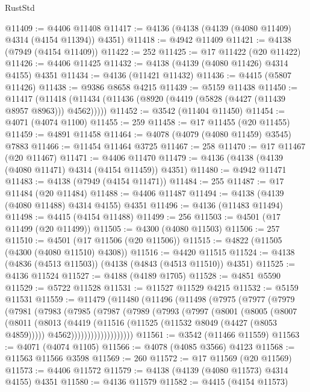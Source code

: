 \begin{lexlean}{RustStd}
\begin{coremodule}
@11409 := @4406 @11408
@11417 := @4136 (@4138 (@4139 (@4080 @11409) @4314 (@4154 @11394)) @4351)
@11418 := @4942 @11409
@11421 := @4138 (@7949 (@4154 @11409))
@11422 := 252
@11425 := @17 @11422 (@20 @11422)
@11426 := @4406 @11425
@11432 := @4138 (@4139 (@4080 @11426) @4314 @4155) @4351
@11434 := @4136 (@11421 @11432)
@11436 := @4415 (@5807 @11426)
@11438 := @9386 @8658 @4215
@11439 := @5159 @11438
@11450 := @11417
    (@11418 (@11434 (@11436 (@8920 (@4419 (@5828 (@4427 (@11439 @8957 @8963))) @4562)))))
@11452 := @3542 (@11404 @11450)
@11454 := @4071 (@4074 @1100)
@11455 := 259
@11458 := @17 @11455 (@20 @11455)
@11459 := @4891 @11458
@11464 := @4078 (@4079 (@4080 @11459) @3545) @7883
@11466 := @11454 @11464 @3725
@11467 := 258
@11470 := @17 @11467 (@20 @11467)
@11471 := @4406 @11470
@11479 := @4136 (@4138 (@4139 (@4080 @11471) @4314 (@4154 @11459)) @4351)
@11480 := @4942 @11471
@11483 := @4138 (@7949 (@4154 @11471))
@11484 := 255
@11487 := @17 @11484 (@20 @11484)
@11488 := @4406 @11487
@11494 := @4138 (@4139 (@4080 @11488) @4314 @4155) @4351
@11496 := @4136 (@11483 @11494)
@11498 := @4415 (@4154 @11488)
@11499 := 256
@11503 := @4501 (@17 @11499 (@20 @11499))
@11505 := @4300 (@4080 @11503)
@11506 := 257
@11510 := @4501 (@17 @11506 (@20 @11506))
@11515 := @4822 (@11505 (@4300 (@4080 @11510) @4308))
@11516 := @4420 @11515
@11524 := @4138 (@4836 (@4513 @11503)) (@4138 (@4843 (@4513 @11510)) @4351)
@11525 := @4136 @11524
@11527 := @4188 (@4189 @1705)
@11528 := @4851 @5590
@11529 := @5722 @11528
@11531 := @11527 @11529 @4215
@11532 := @5159 @11531
@11559 := @11479
    (@11480
      (@11496
        (@11498
          (@7975
            (@7977
              (@7979
                (@7981
                  (@7983
                    (@7985
                      (@7987
                        (@7989
                          (@7993
                            (@7997
                              (@8001
                                (@8005
                                  (@8007
                                    (@8011
                                      (@8013
                                        (@4419
                                          (@11516 (@11525 (@11532 @8049 (@4427 (@8053 @4859)))))
                                          @4562)))))))))))))))))))
@11561 := @3542 (@11466 @11559)
@11563 := @4071 (@4074 @1105)
@11566 := @4078 (@4085 @3566) @4123
@11568 := @11563 @11566 @3598
@11569 := 260
@11572 := @17 @11569 (@20 @11569)
@11573 := @4406 @11572
@11579 := @4138 (@4139 (@4080 @11573) @4314 @4155) @4351
@11580 := @4136 @11579
@11582 := @4415 (@4154 @11573)

\end{coremodule}
\end{lexlean}
